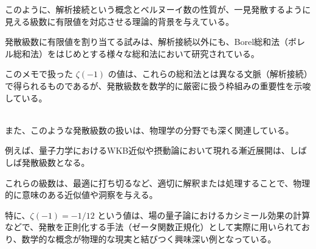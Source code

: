 \documentclass[uplatex,a4j,12pt,dvipdfmx]{jsarticle}
\begin{document}
このように、解析接続という概念とベルヌーイ数の性質が、一見発散するように見える級数に有限値を対応させる理論的背景を与えている。

発散級数に有限値を割り当てる試みは、解析接続以外にも、Borel総和法（ボレル総和法）をはじめとする様々な総和法において研究されている。

このメモで扱った $\zeta(-1)$ の値は、これらの総和法とは異なる文脈（解析接続）で得られるものであるが、発散級数を数学的に厳密に扱う枠組みの重要性を示唆している。

\ \\

また、このような発散級数の扱いは、物理学の分野でも深く関連している。

例えば、量子力学におけるWKB近似や摂動論において現れる漸近展開は、しばしば発散級数となる。

これらの級数は、最適に打ち切るなど、適切に解釈または処理することで、物理的に意味のある近似値や洞察を与える。

特に、$\zeta(-1)=-1/12$ という値は、場の量子論におけるカシミール効果の計算などで、発散を正則化する手法（ゼータ関数正規化）として実際に用いられており、数学的な概念が物理的な現実と結びつく興味深い例となっている。
\end{document}
